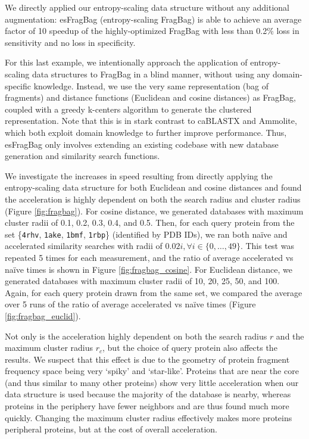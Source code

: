 \documentclass[review,preprint,12pt]{elsarticle}
\theoremstyle{definition}
\theoremstyle{remark}
\numberwithin{equation}{section}
\begin{document}
We directly applied our entropy-scaling data structure without any additional 
augmentation: esFragBag (entropy-scaling FragBag) is able to achieve an average
factor of 10 speedup of the highly-optimized FragBag with less than 0.2\% loss 
in sensitivity and no loss in specificity.

For this last example, we intentionally approach the application of entropy-scaling data structures to FragBag in a blind manner,
without using any domain-specific knowledge.
Instead, we use the very same representation (bag of fragments) and distance functions (Euclidean and cosine distances)
as FragBag, coupled with a greedy k-centers algorithm to generate the clustered representation.
Note that this is in stark contrast to caBLASTX and Ammolite, which both exploit domain knowledge to further improve performance.
Thus, esFragBag only involves extending an existing codebase with new database generation and similarity search functions.

We investigate the increases in speed resulting from directly applying the entropy-scaling data structure for both Euclidean and cosine distances and found the acceleration is highly dependent on both the search radius and cluster radius (Figure \ref{fig:fragbag}).
For cosine distance, we generated databases with maximum cluster radii of 0.1, 0.2, 0.3, 0.4, and 0.5.
Then, for each query protein from the set \{\texttt{4rhv}, \texttt{1ake}, \texttt{1bmf}, \texttt{1rbp}\} (identified by PDB IDs), we ran both na\"ive and accelerated similarity searches with radii of $0.02i, \forall i \in \{0,\ldots,49\}$.
This test was repeated 5 times for each measurement, and the ratio of average accelerated vs na\"ive times is shown in Figure \ref{fig:fragbag_cosine}.
For Euclidean distance, we generated databases with maximum cluster radii of 10, 20, 25, 50, and 100.
Again, for each query protein drawn from the same set, we compared the average over 5 runs of the ratio of average accelerated vs na\"ive times (Figure \ref{fig:fragbag_euclid}).

Not only is the acceleration highly dependent on both the search radius $r$ and the maximum cluster radius $r_c$,
but the choice of query protein also affects the results.
We suspect that this effect is due to the geometry of protein fragment frequency space being very `spiky' and `star-like'.
Proteins that are near the core (and thus similar to many other proteins) show very little acceleration when our data structure is used because the majority of the database is nearby, whereas proteins in the periphery have fewer neighbors and are thus found much more quickly.
Changing the maximum cluster radius effectively makes more proteins peripheral proteins, but at the cost of overall acceleration.
\end{document}
